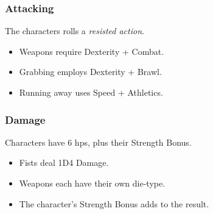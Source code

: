 \subsubsection*{Attacking}

The characters rolls a \textit{resisted action}.
\begin{itemize}
  \item
  Weapons require Dexterity + Combat.
  \item
  Grabbing employs Dexterity + Brawl.
  \item
  Running away uses Speed + Athletics.
\end{itemize}

\subsubsection*{Damage}

Characters have 6 \glspl{hp}, plus their Strength Bonus.

\begin{itemize}

  \item
  Fists deal 1D4 Damage.
  \item
  Weapons each have their own die-type.
  \item
  The character's Strength Bonus adds to the result.
\end{itemize}

